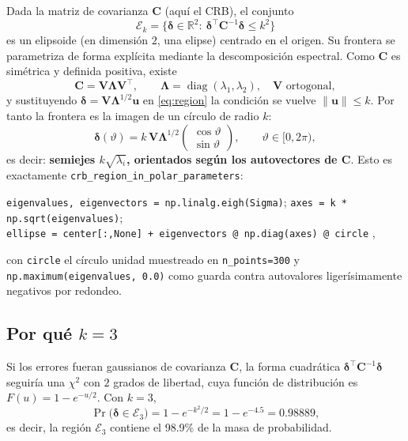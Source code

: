 \documentclass[11pt,a4paper]{article}
\newcommand{\vect}[1]{\boldsymbol{#1}}
\newcommand{\matr}[1]{\mathbf{#1}}
\newcommand{\code}[1]{\texttt{#1}}
\theoremstyle{definition}
\theoremstyle{plain}
\begin{document}
Dada la matriz de covarianza $\matr C$ (aquí el CRB), el conjunto
%
\begin{equation}
\label{eq:region}
\mathcal E_k = \bigl\{\vect\delta\in\mathbb R^2:\
\vect\delta^\top \matr C^{-1}\vect\delta \le k^2 \bigr\}
\end{equation}
%
es un elipsoide (en dimensión $2$, una elipse) centrado en el origen. Su
frontera se parametriza de forma explícita mediante la descomposición espectral.
Como $\matr C$ es simétrica y definida positiva, existe
%
\begin{equation}
\label{eq:eig}
\matr C = \matr V\matr\Lambda\matr V^\top,
\qquad \matr\Lambda=\operatorname{diag}(\lambda_1,\lambda_2),\quad
\matr V \text{ ortogonal},
\end{equation}
%
y sustituyendo $\vect\delta=\matr V\matr\Lambda^{1/2}\vect u$ en
\eqref{eq:region} la condición se vuelve $\lVert\vect u\rVert\le k$. Por tanto la
frontera es la imagen de un círculo de radio $k$:
%
\begin{equation}
\label{eq:ellipse}
\vect\delta(\vartheta)
= k\,\matr V \matr\Lambda^{1/2}
  \begin{pmatrix}\cos\vartheta\\ \sin\vartheta\end{pmatrix},
\qquad \vartheta\in[0,2\pi) ,
\end{equation}
%
es decir: \textbf{semiejes $k\sqrt{\lambda_i}$, orientados según los
autovectores de $\matr C$}. Esto es exactamente
\code{crb\_region\_in\_polar\_parameters}:
%
\begin{center}
\code{eigenvalues, eigenvectors = np.linalg.eigh(Sigma)};\quad
\code{axes = k * np.sqrt(eigenvalues)};\\
\code{ellipse = center[:,None] + eigenvectors @ np.diag(axes) @ circle} ,
\end{center}
%
con \code{circle} el círculo unidad muestreado en \code{n\_points=300} y
\code{np.maximum(eigenvalues, 0.0)} como guarda contra autovalores
ligerísimamente negativos por redondeo.

\subsection{Por qué \texorpdfstring{$k=3$}{k=3}}

Si los errores fueran gaussianos de covarianza $\matr C$, la forma cuadrática
$\vect\delta^\top\matr C^{-1}\vect\delta$ seguiría una $\chi^2$ con $2$ grados
de libertad, cuya función de distribución es $F(u)=1-e^{-u/2}$. Con $k=3$,
%
\begin{equation}
\label{eq:cobertura}
\Pr\bigl(\vect\delta\in\mathcal E_3\bigr) = 1-e^{-k^2/2} = 1-e^{-4.5}
= 0.98889 ,
\end{equation}
%
es decir, la región $\mathcal E_3$ contiene el 98.9\% de la masa de
probabilidad.
\end{document}
